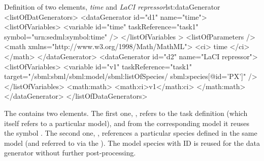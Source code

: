 %
\begin{myXmlLst}{Definition of two  elements, \emph{time} and \emph{LaCI repressor}}{lst:dataGenerator}
<listOfDatGenerators>
 <dataGenerator id="d1" name="time">
  <listOfVariables>
   <variable id="time" taskReference="task1" symbol="urn:sedml:symbol:time" />
  </listOfVariables >
  <listOfParameters />
  <math xmlns="http://www.w3.org/1998/Math/MathML">
   <ci> time </ci>
  </math>
 </dataGenerator>
 <dataGenerator id="d2" name="LaCI repressor">
  <listOfVariables>
   <variable id="v1" taskReference="task1" 
    target="/sbml:sbml/sbml:model/sbml:listOfSpecies/
            sbml:species[@id='PX']" />
  </listOfVariables>
  <math:math>
   <math:ci>v1</math:ci>
  </math:math>
 </dataGenerator>
</listOfDataGenerators>
\end{myXmlLst}
%
The  contains two  elements. 
The first one, , refers to the task definition  (which itself refers to a particular model), and from the corresponding model it reuses the symbol .
The second one, , references a particular species defined in the same model (and referred to via the ). The model species with ID  is reused for the data generator  without further post-processing.




